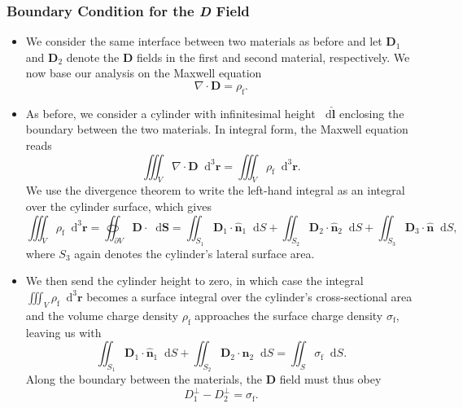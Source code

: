 \documentclass[11pt, a4paper]{article}
\newcommand{\diff}{\mathop{}\!\mathrm{d}} %
\newcommand{\dr}{\diff^{3} \r}  %
\renewcommand{\vec}[1]{\bm{#1}} %
\newcommand{\uvec}[1]{\hat{\vec{#1}}} %
\renewcommand{\r}{\vec{r}}
\newcommand{\D}{\vec{D}}  %
\renewcommand{\div}{\nabla \cdot}
\begin{document}
\subsubsection{Boundary Condition for the \textit{D} Field}
\begin{itemize}
	\item We consider the same interface between two materials as before and let $ \D_{1} $ and $ \D_{2} $ denote the $ \D $ fields in the first and second material, respectively. We now base our analysis on the Maxwell equation
	\begin{equation*}
		\div \D = \rho_{\text{f}}.
	\end{equation*}
	
	\item As before, we consider a cylinder with infinitesimal height $ \diff \uvec{l} $ enclosing the boundary between the two materials. In integral form, the Maxwell equation reads
	\begin{equation*}
		\iiint_{V} \div \D \dr = \iiint_{V}\rho_{\text{f}}\dr.
	\end{equation*}
	We use the divergence theorem to write the left-hand integral as an integral over the cylinder surface, which gives
    \begin{equation*}
        \iiint_{V} \rho_{\text{f}} \dr = \oiint_{\partial V} \D \cdot \diff \vec{S} = \iint_{S_{1}}\D_{1} \cdot \uvec{n}_{1}\diff S +  \iint_{S_{2}}\D_{2} \cdot \uvec{n}_{2}\diff S +  \iint_{S_{3}}\D_{3} \cdot \uvec{n}\diff S,
    \end{equation*}
	where $ S_{3} $ again denotes the cylinder's lateral surface area. 
    
    \item We then send the cylinder height to zero, in which case the integral $ \iiint_{V}\rho_{\text{f}}\dr $ becomes a surface integral over the cylinder's cross-sectional area and the volume charge density $ \rho_{\text{f}} $ approaches the surface charge density $ \sigma_{\text{f}} $, leaving us with
	\begin{equation*}
		 \iint_{S_{1}}\D_{1} \cdot \uvec{n}_{1}\diff S +  \iint_{S_{2}}\D_{2} \cdot \uvec{n}_{2}\diff S = \iint_{S}\sigma_{\text{f}} \diff S.
	\end{equation*}
    Along the boundary between the materials, the $ \D $ field must thus obey
	\begin{equation*}
        D_{1}^{\perp} - D_{2}^{\perp} = \sigma_{\text{f}}.
	\end{equation*}
	
\end{itemize}
\end{document}
